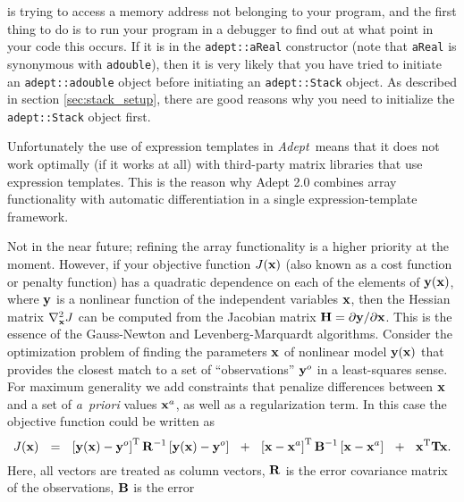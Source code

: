 \documentclass[a4,oneside]{book}
\def\codesize{\small}
\def\x{\ensuremath{{\bf x}}}
\def\y{\ensuremath{{\bf y}}}
\def\Adept{\emph{Adept}}
\def\code#1{{\codesize\texttt{#1}}}
\begin{document}
\begin{description}
  is trying to access a memory address not belonging to your program,
  and the first thing to do is to run your program in a debugger to
  find out at what point in your code this occurs. If it is in the
  \code{adept::aReal} constructor (note that \code{aReal} is synonymous with
  \code{adouble}), then it is very likely that you have tried to
  initiate an \code{adept::adouble} object before initiating an
  \code{adept::Stack} object. As described in section
  \ref{sec:stack_setup}, there are good reasons why you need to
  initialize the \code{adept::Stack} object first.
\item[How can I interface \Adept\ with a matrix library such as
  Eigen?]  Unfortunately the use of expression templates in
  \Adept\ means that it does not work optimally (if it works at all)
  with third-party matrix libraries that use expression
  templates. This is the reason why Adept 2.0 combines array
  functionality with automatic differentiation in a single
  expression-template framework.
\item[Do you have plans to enable \Adept\ to produce Hessian
  matrices?]  Not in the near future; refining the array functionality
  is a higher priority at the moment.  However, if your objective
  function $J(\x)$ (also known as a cost function or penalty function)
  has a quadratic dependence on each of the elements of $\y(\x)$,
  where $\y$ is a nonlinear function of the independent variables
  $\x$, then the Hessian matrix $\nabla_\x^2 J$ can be computed from
  the Jacobian matrix ${\bf H}=\partial\y/\partial\x$. This is the
  essence of the Gauss-Newton and Levenberg-Marquardt
  algorithms. Consider the optimization problem of finding the
  parameters $\x$ of nonlinear model $\y(\x)$ that provides the
  closest match to a set of ``observations'' $\y^o$ in a least-squares
  sense.  For maximum generality we add constraints that penalize
  differences between $\x$ and a set of \emph{a~priori} values $\x^a$,
  as well as a regularization term.  In this case the objective
  function could be written as \def\myspace{~~}
\begin{equation}
J(\x) \myspace =\myspace \left[\y(\x)-\y^o\right]^\mathrm{T}{\bf
  R}^{-1}\left[\y(\x)-\y^o\right]
\myspace+\myspace\left[\x-\x^a\right]^\mathrm{T}{\bf
  B}^{-1}\left[\x-\x^a\right]
\myspace+\myspace\x^\mathrm{T}{\bf T}\x.\nonumber
\label{eq:objective}
\end{equation}
  Here, all vectors are treated as column vectors, ${\bf R}$ is the
  error covariance matrix of the observations, ${\bf B}$ is the error

\end{description}
\end{document}
